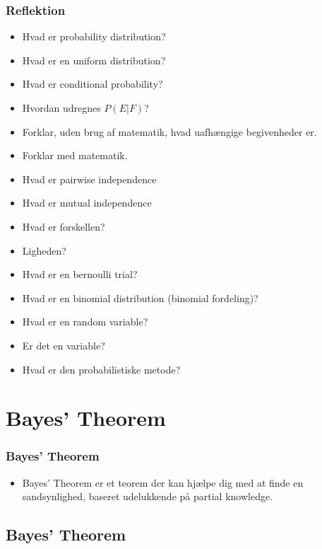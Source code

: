 \documentclass{beamer}
\begin{document}
\begin{frame}[allowframebreaks]
  \frametitle{Reflektion}
  \begin{itemize}
  \item Hvad er probability distribution? 
  \item Hvad er en uniform distribution?
  \item Hvad er conditional probability?
  \item Hvordan udregnes $P(E|F)$?
  \item Forklar, uden brug af matematik, hvad uafhængige begivenheder er.
  \item Forklar med matematik.
  \item Hvad er pairwise independence
  \item Hvad er mutual independence
  \item Hvad er forskellen?
  \item Ligheden?
  \item Hvad er en bernoulli trial?
  \item Hvad er en binomial distribution (binomial fordeling)?
  \item Hvad er en random variable? 
  \item Er det en variable?
  \item Hvad er den probabilistiske metode?
  \end{itemize} 
\end{frame}

\section{Bayes' Theorem}
\label{sec:bayes}

\begin{frame}
  \frametitle{Bayes' Theorem}
  \begin{itemize}
  \item Bayes' Theorem er et teorem der kan hjælpe dig med at finde en sandsynlighed, baseret udelukkende på partial knowledge.
  \end{itemize} 
\end{frame}

\subsection{Bayes' Theorem}
\label{subsec:bayes-theorem}
\end{document}
